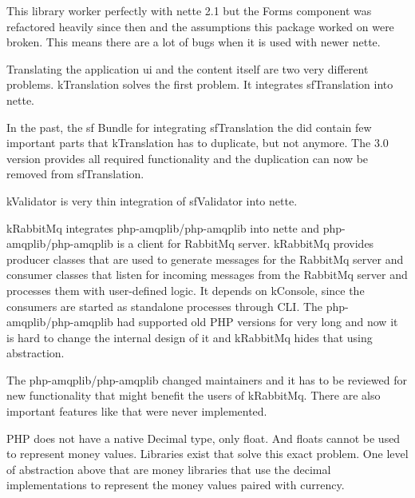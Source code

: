 This library worker perfectly with \gls{nette} 2.1 but the Forms component was refactored heavily since then and the assumptions this package worked on were broken. This means there are a lot of bugs when it is used with newer \gls{nette}.

 \label{sec:state:translation}

Translating the application \gls{ui} and the content itself are two very different problems. \gls{kTranslation} solves the first problem. It integrates \gls{sfTranslation} into \gls{nette}.

In the past, the \gls{sf} Bundle for integrating \gls{sfTranslation} the did contain few important parts that \gls{kTranslation} has to duplicate, but not anymore. The 3.0 version provides all required functionality and the duplication can now be removed from \gls{sfTranslation}.

 \label{sec:state:validator}

\gls{kValidator} is very thin integration of \gls{sfValidator} into \gls{nette}.

 \label{sec:state:rabbit-mq}

\gls{kRabbitMq} integrates php-amqplib/php-amqplib into \gls{nette} and php-amqplib/php-amqplib is a client for RabbitMq server. \gls{kRabbitMq} provides producer classes that are used to generate messages for the RabbitMq server and consumer classes that listen for incoming messages from the RabbitMq server and processes them with user-defined logic. It depends on \gls{kConsole}, since the consumers are started as standalone processes through CLI. The php-amqplib/php-amqplib had supported old PHP versions for very long and now it is hard to change the internal design of it and \gls{kRabbitMq} hides that using abstraction.

The php-amqplib/php-amqplib changed maintainers and it has to be reviewed for new functionality that might benefit the users of \gls{kRabbitMq}. There are also important features like  that were never implemented.

 \label{sec:state:money}

PHP does not have a native Decimal type, only float. And floats cannot be used to represent money values. Libraries exist that solve this exact problem. One level of abstraction above that are money libraries that use the decimal implementations to represent the money values paired with currency.

